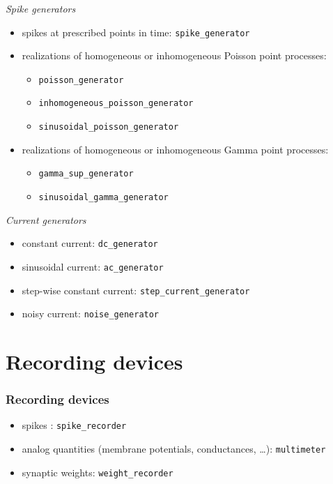 \documentclass[8pt,t,usepdftitle=false]{beamer}
\begin{document}
\begin{frame}[t,plain]
  \frametitle{\ttl}
    \emph{Spike generators}
  \begin{itemize}
    \item spikes at prescribed points in time: \texttt{spike\_generator}
    \item realizations of homogeneous or inhomogeneous Poisson point processes:
      \begin{itemize}
      \item \texttt{poisson\_generator}
      \item \texttt{inhomogeneous\_poisson\_generator}
      \item \texttt{sinusoidal\_poisson\_generator}
      \end{itemize}
    \item realizations of homogeneous or inhomogeneous Gamma point processes:
      \begin{itemize}
      \item \texttt{gamma\_sup\_generator}\
      \item \texttt{sinusoidal\_gamma\_generator}
      \end{itemize}
  \end{itemize}
  \vspace*{2ex}
  \emph{Current generators}
  \begin{itemize}
    \item constant current: \texttt{dc\_generator}
    \item sinusoidal current: \texttt{ac\_generator}
    \item step-wise constant current: \texttt{step\_current\_generator}
    \item  noisy current: \texttt{noise\_generator}
    \end{itemize}
\end{frame}
\def\ttl{Recording devices}\section{\ttl}
\begin{frame}[t,plain]
  \frametitle{\ttl}
   \begin{itemize}
    \item spikes : \texttt{spike\_recorder} 
    \item analog quantities (membrane potentials, conductances, \ldots): \texttt{multimeter} 
    \item synaptic weights: \texttt{weight\_recorder}
    \end{itemize}
\end{frame}
\end{document}
